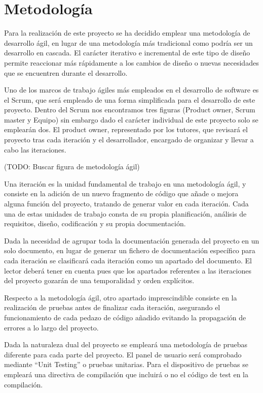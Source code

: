\section{Metodología}

    Para la realización de este proyecto se ha decidido emplear una metodología de desarrollo ágil, en lugar de una metodología más tradicional como podría ser un desarrollo en cascada. El carácter iterativo e incremental de este tipo de diseño permite reaccionar más rápidamente a los cambios de diseño o nuevas necesidades que se encuentren durante el desarrollo.

    Uno de los marcos de trabajo ágiles más empleados en el desarrollo de software es el Scrum, que será empleado de una forma simplificada para el desarrollo de este proyecto. Dentro del Scrum nos encontramos tres figuras (Product owner, Scrum master y Equipo) sin embargo dado el carácter individual de este proyecto solo se emplearán dos. El product owner, representado por los tutores, que revisará el proyecto tras cada iteración y el desarrollador, encargado de organizar y llevar a cabo las iteraciones.

    (TODO: Buscar figura de metodología ágil)

    Una iteración es la unidad fundamental de trabajo en una metodología ágil, y consiste en la adición de un nuevo fragmento de código que añade o mejora alguna función del proyecto, tratando de generar valor en cada iteración. Cada una de estas unidades de trabajo consta de su propia planificación, análisis de requisitos, diseño, codificación y su propia documentación.

    Dada la necesidad de agrupar toda la documentación generada del proyecto en un solo documento, en lugar de generar un fichero de documentación específico para cada iteración se clasificará cada iteración como un apartado del documento. El lector deberá tener en cuenta pues que los apartados referentes a las iteraciones del proyecto gozarán de una temporalidad y orden explícitos.
    
    Respecto a la metodología ágil, otro apartado imprescindible consiste en la realización de pruebas antes de finalizar cada iteración, asegurando el funcionamiento de cada pedazo de código añadido evitando la propagación de errores a lo largo del proyecto.
    
    Dada la naturaleza dual del proyecto se empleará una metodología de pruebas diferente para cada parte del proyecto. El panel de usuario será comprobado mediante ``Unit Testing'' o pruebas unitarias. Para el dispositivo de pruebas se empleará una directiva de compilación que incluirá o no el código de test en la compilación.

\clearpage

\chapterend{}

